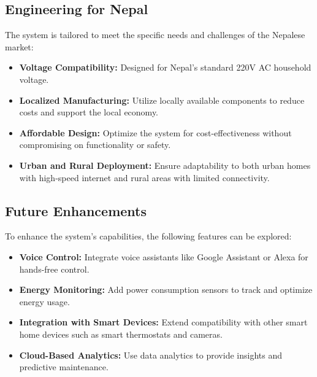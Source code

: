 \subsection*{Engineering for Nepal}
The system is tailored to meet the specific needs and challenges of the Nepalese market:

\begin{itemize}
	\item \textbf{Voltage Compatibility:} Designed for Nepal's standard 220V AC household voltage.
	\item \textbf{Localized Manufacturing:} Utilize locally available components to reduce costs and support the local economy.
	\item \textbf{Affordable Design:} Optimize the system for cost-effectiveness without compromising on functionality or safety.
	\item \textbf{Urban and Rural Deployment:} Ensure adaptability to both urban homes with high-speed internet and rural areas with limited connectivity.
\end{itemize}

\subsection*{Future Enhancements}
To enhance the system's capabilities, the following features can be explored:

\begin{itemize}
	\item \textbf{Voice Control:} Integrate voice assistants like Google Assistant or Alexa for hands-free control.
	\item \textbf{Energy Monitoring:} Add power consumption sensors to track and optimize energy usage.
	\item \textbf{Integration with Smart Devices:} Extend compatibility with other smart home devices such as smart thermostats and cameras.
	\item \textbf{Cloud-Based Analytics:} Use data analytics to provide insights and predictive maintenance.
\end{itemize}
